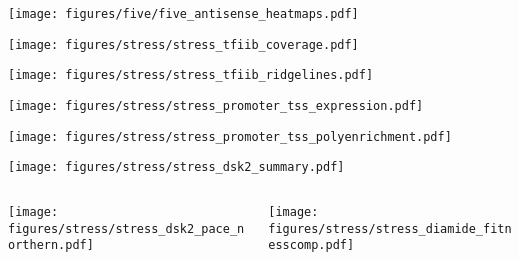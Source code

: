 \documentclass[aspectratio=169]{beamer}
\begin{document}
\begin{frame}
    \texttt{[image: figures/five/five\_antisense\_heatmaps.pdf]}
\end{frame}

\begin{frame}
    \texttt{[image: figures/stress/stress\_tfiib\_coverage.pdf]}
\end{frame}

\begin{frame}
    \texttt{[image: figures/stress/stress\_tfiib\_ridgelines.pdf]}
\end{frame}

\begin{frame}
    \texttt{[image: figures/stress/stress\_promoter\_tss\_expression.pdf]}
\end{frame}

\begin{frame}
    \texttt{[image: figures/stress/stress\_promoter\_tss\_polyenrichment.pdf]}
\end{frame}

\begin{frame}
    \texttt{[image: figures/stress/stress\_dsk2\_summary.pdf]}
\end{frame}

\begin{frame}
    \begin{columns}
        \begin{column}{0.5\textwidth}
            \texttt{[image: figures/stress/stress\_dsk2\_pace\_northern.pdf]}
        \end{column}
        \begin{column}{0.5\textwidth}
            \texttt{[image: figures/stress/stress\_diamide\_fitnesscomp.pdf]}
        \end{column}
    \end{columns}
\end{frame}
\end{document}
